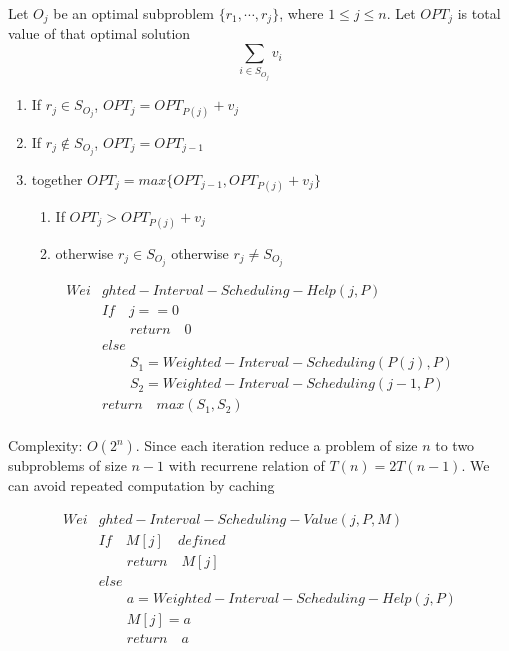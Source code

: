 \documentclass[11pt]{article}
\begin{document}
\begin{solution}

  Let $O_j$ be an optimal subproblem $\{ r_1, \cdots, r_j\}$, where $1\leq j \leq n$. Let $OPT_j$ is total value of that optimal solution
  \[
    \sum_{i\in S_{O_j}} v_i
  \]
  \begin{enumerate}
    \item If $r_j \in S_{O_j}$, $OPT_j = OPT_{P(j)} + v_j$
    \item If $r_j \not\in S_{O_j}$, $OPT_j = OPT_{j-1}$
    \item together $OPT_j = max \{ OPT_{j-1}, OPT_{P(j)} + v_j\}$
    \begin{enumerate}
      \item If $OPT_j > OPT_{P(j)} + v_j$
      \item otherwise $r_j \in S_{O_j}$ otherwise $r_j \neq S_{O_j}$
    \end{enumerate}
  \end{enumerate}

  \begin{align*}
    Wei&ghted-Interval-Scheduling-Help(j, P)\\
    &If\quad j == 0\\
    &\quad \quad return \quad 0\\
    &else \\
    &\quad \quad S_1 = Weighted-Interval-Scheduling(P(j), P)\\
    &\quad \quad S_2 = Weighted-Interval-Scheduling(j-1, P)\\
    &return \quad max(S_1, S_2)\\
  \end{align*}

  Complexity: $O(2^n)$. Since each iteration reduce a problem of size $n$ to two subproblems of size $n-1$ with recurrene relation of $T(n) = 2T(n-1)$. We can avoid repeated computation by caching

  \begin{align*}
    Wei&ghted-Interval-Scheduling-Value(j, P, M)\\
      &If\quad M[j] \quad defined\\
      &\quad \quad return \quad M[j]\\
      &else \\
      &\quad \quad a = Weighted-Interval-Scheduling-Help(j ,P)\\
      &\quad \quad M[j] = a\\
      &\quad \quad return \quad a\\
  \end{align*}


\end{solution}
\end{document}
